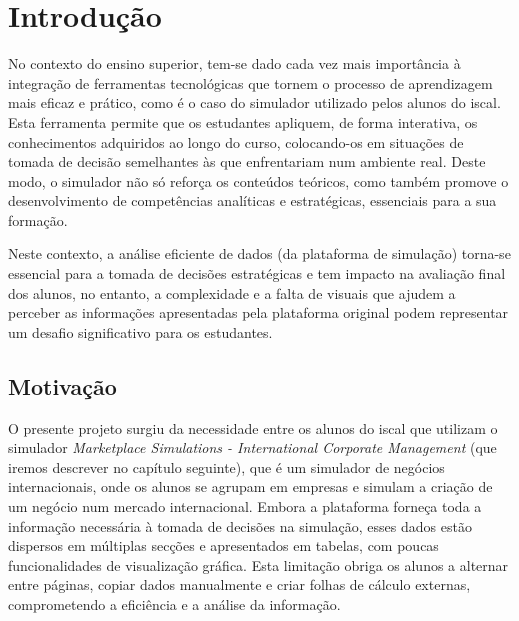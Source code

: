 

\chapter{Introdução}
\label{ch:introducao}

No contexto do ensino superior, tem-se dado cada vez mais importância à integração de ferramentas tecnológicas que tornem o processo de aprendizagem mais eficaz e prático, como é o caso do simulador utilizado pelos alunos do \gls{iscal}. Esta ferramenta permite que os estudantes apliquem, de forma interativa, os conhecimentos adquiridos ao longo do curso, colocando-os em situações de tomada de decisão semelhantes às que enfrentariam num ambiente real. Deste modo, o simulador não só reforça os conteúdos teóricos, como também promove o desenvolvimento de competências analíticas e estratégicas, essenciais para a sua formação. 

Neste contexto, a análise eficiente de dados (da plataforma de simulação) torna-se essencial para a tomada de decisões estratégicas e tem impacto na avaliação final dos alunos, no entanto, a complexidade e a falta de visuais que ajudem a perceber as informações apresentadas pela plataforma original podem representar um desafio significativo para os estudantes.

\section{Motivação}
O presente projeto surgiu da necessidade  entre os alunos do \gls{iscal} que utilizam o simulador \textit{Marketplace Simulations - International Corporate Management} (que iremos descrever no capítulo seguinte), que é um simulador de negócios internacionais, onde os alunos se agrupam em empresas e simulam a criação de um negócio num mercado internacional. Embora a plataforma forneça toda a informação necessária à tomada de decisões na simulação, esses dados estão dispersos em múltiplas secções e apresentados em tabelas, com poucas funcionalidades de visualização gráfica. Esta limitação obriga os alunos a alternar entre páginas, copiar dados manualmente e criar folhas de cálculo externas, comprometendo a eficiência e a análise da informação.


